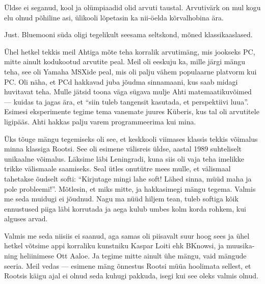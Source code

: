 Üldse ei seganud, kool ja olümpiaadid olid arvuti taustal. Arvutivärk on mul kogu elu olnud põhiline asi, ülikooli lõpetasin ka nii-öelda kõrvalhobina ära.


Just. Bluemooni süda oligi tegelikult seesama seltskond, mõned klassikaaslased. 


Ühel hetkel tekkis meil Ahtiga 
mõte teha korralik arvutimäng, mis jookseks PC, mitte 
ainult kodukootud arvutite peal. Meil oli eeskuju ka, mille järgi 
mängu teha, see oli Yamaha MSXide peal, mis oli 
palju vähem populaarne platvorm kui PC. Oli näha, et PCd hakkavad juba jõudma 
sinnamaani, kus saab midagi huvitavat teha. Mulle jätsid toona väga sügava 
mulje Ahti matemaatikuvõimed --- kuidas ta jagas ära, et 
\enquote{siin tuleb tangensit kasutada, et perspektiivi luua}. 
Esimesi eksperimente tegime tema vanemate juures Küberis, kus tal 
oli arvutitele ligipääs. Ahti hakkas palju varem programmeerima kui mina. 

Üks tõuge mängu tegemiseks oli see, et keskkooli viimases klassis tekkis võimalus minna klassiga Rootsi. See oli esimene 
välisreis üldse, aastal 1989 suhteliselt unikaalne võimalus. Läksime läbi 
Leningradi, kuna siis oli vaja teha imelikke trikke välismaale 
saamiseks. Seal ütles onutütre mees mulle, et välismaal tahetakse õudselt 
softi: \enquote{Kirjutage mingi lahe soft! Lähed sinna, müüd maha ja pole
probleemi!}. Mõtlesin, et miks mitte, ja hakkasimegi mängu tegema. 
Valmis me seda muidugi ei 
jõudnud. Nagu ma nüüd hiljem tean, tuleb softiga kõik ennustused 
piiga läbi korrutada ja aega kulub umbes kolm korda rohkem, kui alguses arvad. 

Valmis me seda niisiis ei saanud, aga samas oli piisavalt suur hoog sees ja 
ühel hetkel võtsime appi korraliku kunstniku Kaspar 
Loiti ehk BKnowsi, ja muusika- ning heliinimese Ott 
Aaloe. Ja tegime mitte ainult ühe mängu, vaid 
mängude seeria. Meil vedas --- esimene mäng 
õnnestus Rootsi müüa hoolimata sellest, et Rootsis käigu ajal ei olnud seda 
kuhugi pakkuda, isegi kui see oleks valmis olnud.


